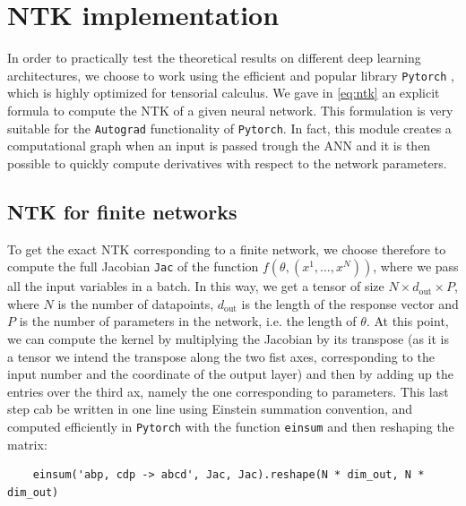 \documentclass[11pt,notitlepage]{article}
\numberwithin{equation}{section}
\theoremstyle{remark}
\theoremstyle{definition}
\begin{document}
	
	\section{NTK implementation}\label{sec:implementation}
	
	In order to practically test the theoretical results on different deep learning architectures, we choose to work using the efficient and popular library \verb|Pytorch| \cite{pytorch}, which is highly optimized for tensorial calculus.
	We gave in \eqref{eq:ntk} an explicit formula to compute the NTK of a given neural network.
	This formulation is very suitable for the \verb|Autograd| functionality of \verb|Pytorch|.
	In fact, this module creates a computational graph when an input is passed trough the ANN and it is then possible to quickly compute derivatives with respect to the network parameters.
	
	\subsection{NTK for finite networks}\label{subsec:finiteImpl}
	To get the exact NTK corresponding to a finite network, we choose therefore to compute the full Jacobian \verb|Jac| of the function $f(\theta, (x^1, \dots, x^N))$, where we pass all the input variables in a batch.
	In this way, we get a tensor of size $N \times d_\text{out} \times P$, where $N$ is the number of datapoints, $d_\text{out}$ is the length of the response vector and $P$ is the number of parameters in the network, i.e. the length of $\theta$.
	At this point, we can compute the kernel by multiplying the Jacobian by its transpose (as it is a tensor we intend the transpose along the two fist axes, corresponding to the input number and the coordinate of the output layer) and then by adding up the entries over the third ax, namely the one corresponding to parameters.
	This last step cab be written in one line using Einstein summation convention, and computed efficiently in \verb|Pytorch| with the function \verb|einsum| and then reshaping the matrix:
	\begin{verbatim}
	einsum('abp, cdp -> abcd', Jac, Jac).reshape(N * dim_out, N * dim_out)
	\end{verbatim}
	
\end{document}
